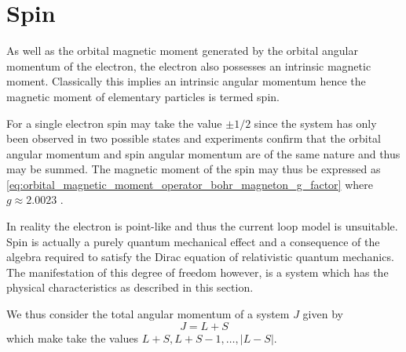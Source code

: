 \section{Spin}
As well as the orbital magnetic moment generated by the orbital angular momentum of the electron, the electron also possesses an intrinsic magnetic moment. Classically this implies an intrinsic angular momentum hence the magnetic moment of elementary particles is termed spin. 

For a single electron spin may take the value $\pm 1/2$ since the system has only been observed in two possible states \cite{Gerlach1922} and experiments confirm that the orbital angular momentum and spin angular momentum are of the same nature and thus may be summed. 
The magnetic moment of the spin may thus be expressed as \ref{eq:orbital_magnetic_moment_operator_bohr_magneton_g_factor} \cite{Povh2002-fj} where $g\approx2.0023$ \cite{electron-g-factor, PhysRevLett.130.071801}. 

In reality the electron is point-like and thus the current loop model is unsuitable. Spin is actually a purely quantum mechanical effect and a consequence of the algebra required to satisfy the Dirac equation of relativistic quantum mechanics. The manifestation of this degree of freedom however, is a system which has the physical characteristics as described in this section. 

We thus consider the total angular momentum of a system $J$ given by 
\begin{equation}
    J = L + S 
    \label{eq:total_angular_momentum}
\end{equation}
which make take the values $L+S, L+ S - 1, \dots, |L-S|$. 



